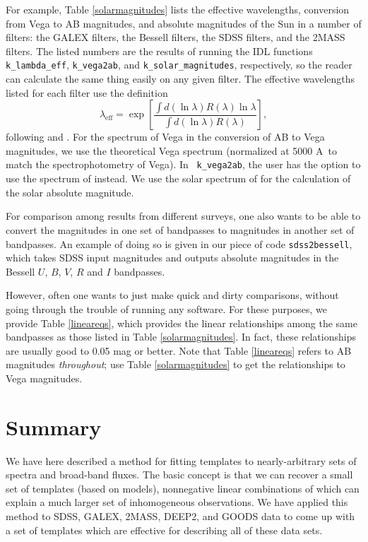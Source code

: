 \documentclass[10pt,preprint]{aastex}
\renewcommand{\AA}{A}
\begin{document}
For example, Table \ref{solarmagnitudes} lists the effective
wavelengths, conversion from Vega to AB magnitudes, and absolute
magnitudes of the Sun in a number of filters: the GALEX filters, the
Bessell filters, the SDSS filters, and the 2MASS filters. The listed
numbers are the results of running the IDL functions {\tt
k\_lambda\_eff}, {\tt k\_vega2ab}, and {\tt k\_solar\_magnitudes},
respectively, so the reader can calculate the same thing easily on any
given filter.  The effective wavelengths listed for each filter use
the definition
\begin{equation}
\label{lden}
\lambda_{\mathrm{eff}} = \exp\left[ 
\frac{\int d(\ln\lambda) R(\lambda) \ln\lambda}
{\int d(\ln\lambda) R(\lambda)} \right],
\end{equation}
following \citet{fukugita96a} and \citet{schneider83a}.  For the
spectrum of Vega in the conversion of AB to Vega magnitudes, we use
the \citet{kurucz91a} theoretical Vega spectrum (normalized at 5000
\AA\ to match the \citet{hayes85a} spectrophotometry of Vega). In {\tt
k\_vega2ab}, the user has the option to use the spectrum of
\citet{hayes85a} instead.  We use the solar spectrum of
\citet{kurucz91a} for the calculation of the solar absolute magnitude.

For comparison among results from different surveys, one also wants to
be able to convert the magnitudes in one set of bandpasses to
magnitudes in another set of bandpasses. An example of doing so is
given in our piece of code {\tt sdss2bessell}, which takes SDSS input
magnitudes and outputs absolute magnitudes in the Bessell $U$, $B$,
$V$, $R$ and $I$ bandpasses. 

However, often one wants to just make quick and dirty comparisons,
without going through the trouble of running any software. For these
purposes, we provide Table \ref{lineareqs}, which provides the linear
relationships among the same bandpasses as those listed in Table
\ref{solarmagnitudes}. In fact, these relationships are usually good
to 0.05 mag or better. Note that Table \ref{lineareqs} refers to AB
magnitudes {\it throughout}; use Table \ref{solarmagnitudes} to get
the relationships to Vega magnitudes.

\section{Summary}
\label{summary}

We have here described a method for fitting templates to
nearly-arbitrary sets of spectra and broad-band fluxes. The basic
concept is that we can recover a small set of templates (based on
models), nonnegative linear combinations of which can explain a much
larger set of inhomogeneous observations.  We have applied this method
to SDSS, GALEX, 2MASS, DEEP2, and GOODS data to come up with a set of
templates which are effective for describing all of these data sets.
\end{document}
